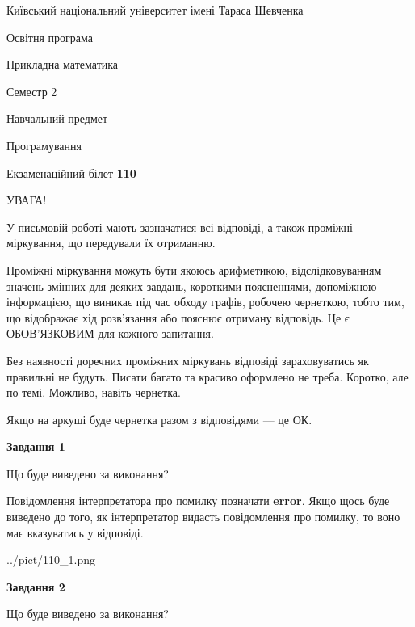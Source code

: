 \documentclass[12pt, ukrainian]{article}
\begin{document}
{{\begin {small}\par
{ \center  Київський національний університет імені Тараса Шевченка \par}
{\parbox {5 cm}{Освітня програма \hfill}{\parbox {7 cm}{Прикладна математика \hfill}}\parbox {6 cm}{\hfill Семестр 2}}\par
{\parbox {5 cm} {Навчальний предмет \hfill}\parbox {7 cm}{Програмування \hfill}\parbox {6cm}{\hfill}\par}\vspace{-7pt} \end{small}}{\center Екзаменаційний білет \No \textbf
{ 110 }\par}}
{
\begin {large}
УВАГА!

У письмовій роботі мають зазначатися всі відповіді, а також проміжні міркування, що передували їх отриманню.

Проміжні міркування можуть бути якоюсь арифметикою, відслідковуванням зна\-чень змінних для деяких завдань,
короткими поясненнями, допоміжною інформацією, що виникає під час обходу графів, робочею чернеткою,
тобто тим, що відображає хід розв’язання або пояснює отриману відповідь.
Це є ОБОВ’ЯЗКОВИМ для кожного запитання.

Без наявності доречних проміжних міркувань відповіді зараховуватись як правиль\-ні не будуть.
Писати багато та красиво оформлено не треба. Коротко, але по темі. Можли\-во, навіть чернетка.

Якщо на аркуші буде чернетка разом з відповідями --- це ОК.

\newpage

{\begin {center}\textbf{Завдання 1}\end {center}}\par
Що буде виведено за виконання?

Повідомлення інтерпретатора про помилку позначати \textbf{error}.
Якщо щось буде виведено до того, як інтерпретатор видасть повідомлення про помилку, 
то воно має вказуватись у відповіді. \par


\begin{center}
	{../pict/110_1.png}
\end{center}
\newpage

{\begin {center}\textbf{Завдання 2}\end {center}}\par
Що буде виведено за виконання?


\end{large}}
\end{document}
